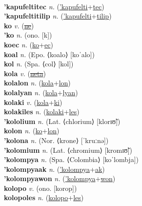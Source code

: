  \label{'kapufeltiwon} \\
\textbf{'kapufeltitec} \textit{n.} (\hyperref['kapufelti]{'kapufelti}+\hyperref[tec]{tec})
 \label{'kapufeltitec} \\
\textbf{'kapufeltitilip} \textit{n.} (\hyperref['kapufelti]{'kapufelti}+\hyperref[tilip]{tilip})
 \label{'kapufeltitilip} \\
\textbf{ko} \textit{v.} (\hyperref[ne]{\sout{ne}})
 \label{ko} \\
\textbf{'ko} \textit{n.} (ono. [k])
 \label{'ko} \\
\textbf{koec} \textit{n.} (\hyperref[ko]{ko}+\hyperref[ec]{ec})
 \label{koec} \\
\textbf{koal} \textit{n.} (Epo. ⟨koalo⟩ [koˈalo])
 \label{koal} \\
\textbf{kol} \textit{n.} (Spa. ⟨col⟩ [kol])
 \label{kol} \\
\textbf{kola} \textit{v.} (\hyperref[neta]{\sout{neta}})
 \label{kola} \\
\textbf{kolalon} \textit{n.} (\hyperref[kola]{kola}+\hyperref[lon]{lon})
 \label{kolalon} \\
\textbf{kolalyan} \textit{n.} (\hyperref[kola]{kola}+\hyperref[lyan]{lyan})
 \label{kolalyan} \\
\textbf{kolaki} \textit{v.} (\hyperref[kola]{kola}+\hyperref[ki]{ki})
 \label{kolaki} \\
\textbf{kolakiles} \textit{n.} (\hyperref[kolaki]{kolaki}+\hyperref[les]{les})
 \label{kolakiles} \\
\textbf{'kololium} \textit{n.} (Lat. ⟨chlorium⟩ [klorɪʊ̃])
 \label{'kololium} \\
\textbf{kolon} \textit{n.} (\hyperref[ko]{ko}+\hyperref[lon]{lon})
 \label{kolon} \\
\textbf{'kolona} \textit{n.} (Nor. ⟨krone⟩ [ˈkruːnə])
 \label{'kolona} \\
\textbf{'kolomium} \textit{n.} (Lat. ⟨chromium⟩ [kromɪʊ̃])
 \label{'kolomium} \\
\textbf{'kolompya} \textit{n.} (Spa. ⟨Colombia⟩ [koˈlombja])
 \label{'kolompya} \\
\textbf{'kolompyaak} \textit{n.} (\hyperref['kolompya]{'kolompya}+\hyperref[ak]{ak})
 \label{'kolompyaak} \\
\textbf{'kolompyawon} \textit{n.} (\hyperref['kolompya]{'kolompya}+\hyperref[won]{won})
 \label{'kolompyawon} \\
\textbf{kolopo} \textit{v.} (ono. [korop])
 \label{kolopo} \\
\textbf{kolopoles} \textit{n.} (\hyperref[kolopo]{kolopo}+\hyperref[les]{les})
